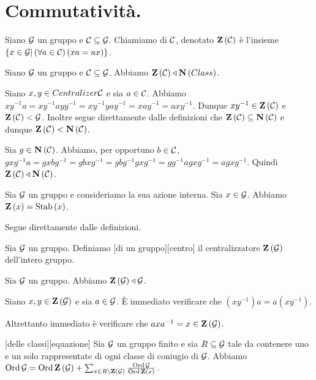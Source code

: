 \section{Commutativit\`a.}\label{Commutativita}
\begin{Definition}
	Siano $\mathcal{G}$ un gruppo e
	$\mathcal{C} \subseteq \mathcal{G}$. Chiamiamo
	di $\mathcal{C}$, denotato
	$\textbf{Z} \left ( \mathcal{C} \right )$ \`e l'insieme
	$\lbrace x \in \mathcal{G} |
	\left ( \forall a \in \mathcal{C} \right ) \left ( xa = ax \right ) \rbrace$.
\end{Definition}
\begin{Theorem}
	Siano $\mathcal{G}$ un gruppo e $\mathcal{C} \subseteq \mathcal{G}$.
	Abbiamo $\textbf{Z} \left ( \mathcal{C} \right ) \triangleleft
	\textbf{N} \left ( Class \right )$.
\end{Theorem}
\Proof
Siano $x, y \in Centralizer{\mathcal{C}}$ e
sia $a \in \mathcal{C}$.
Abbiamo
$xy^{-1}a =
xy^{-1}ayy^{-1} =
xy^{-1}yay^{-1} =
xay^{-1} =
axy^{-1}$.
Dunque $xy^{-1} \in \textbf{Z} \left ( \mathcal{C} \right )$ e
$\textbf{Z} \left ( \mathcal{C} \right ) < \mathcal{G}$.
Inoltre segue direttamente dalle definizioni
che $\textbf{Z} \left ( \mathcal{C} \right ) \subseteq \textbf{N} \left ( \mathcal{C} \right )$ e
dunque $\textbf{Z} \left ( \mathcal{C} \right ) < \textbf{N} \left ( \mathcal{C} \right )$.
\par
Sia $g \in \textbf{N} \left ( \mathcal{C} \right )$. Abbiamo,
per opportuno $b \in \mathcal{C}$,
$gxg^{-1}a =
gxbg^{-1} =
gbxg^{-1} =
gbg^{-1}gxg^{-1} =
gg^{-1}agxg^{-1} =
agxg^{-1}$.
Quindi $\textbf{Z} \left ( \mathcal{C} \right ) \triangleleft
\textbf{N} \left ( \mathcal{C} \right )$.
\EndProof
\begin{Theorem}
	Sia $\mathcal{G}$ un gruppo e consideriamo
	la sua azione interna.
	Sia $x \in \mathcal{G}$.
	Abbiamo $\Centralizer{x} =
	\Stabilizer{x}$.
\end{Theorem}
\Proof
Segue direttamente dalle definizioni.
\EndProof
\begin{Definition}
	Sia $\mathcal{G}$ un gruppo.
	Definiamo
	[di un gruppo][centro]
	il centralizzatore $\textbf{Z} \left ( \mathcal{G} \right )$
	dell'intero gruppo.
\end{Definition}
\begin{Theorem}
	Sia $\mathcal{G}$ un gruppo.
	Abbiamo $\textbf{Z} \left ( \mathcal{G} \right ) \triangleleft \mathcal{G}$.
\end{Theorem}
\Proof
Siano $x, y \in \textbf{Z} \left ( \mathcal{G} \right )$ e sia
$a \in \mathcal{G}$.
\`E immediato verificare che
$(xy^{-1})a = a(xy^{-1})$.
\par
Altrettanto immediato \`e verificare che
$axa^{-1} = x \in \textbf{Z} \left ( \mathcal{G} \right )$.
\EndProof
\begin{Theorem}
[delle classi][equazione]
	Sia $\mathcal{G}$ un gruppo finito e
	sia $R \subseteq \mathcal{G}$ tale da
	contenere uno e un solo rappresentate di
	ogni classe di coniugio di $\mathcal{G}$.
	Abbiamo
	$\operatorname{\operatorname{Ord}}{\mathcal{G}} =
	\operatorname{\operatorname{Ord}}{\textbf{Z} \left ( \mathcal{G} \right )} +
	\sum_{x \in R \setminus \textbf{Z} \left ( \mathcal{G} \right )}
	\frac{\operatorname{\operatorname{Ord}}{\mathcal{G}}}
	{\operatorname{\operatorname{Ord}}{\textbf{Z} \left ( x \right )}}$.
\end{Theorem}
